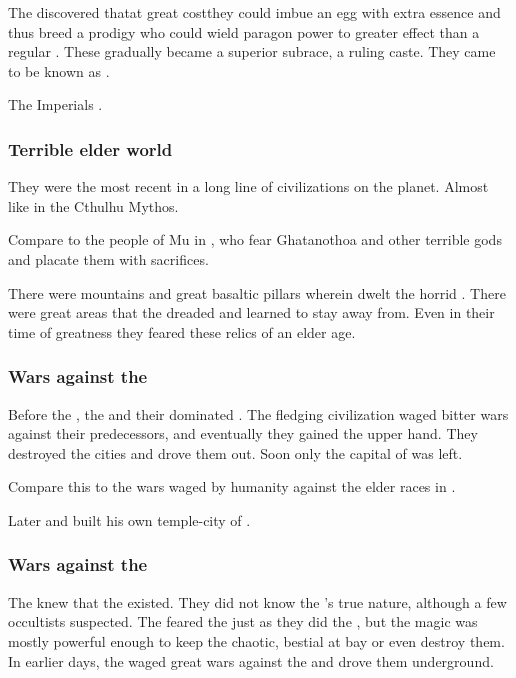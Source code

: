 The \ophidians discovered that\dash at great cost\dash they could imbue an egg with extra essence and thus breed a prodigy who could wield paragon power to greater effect than a regular \ophidian. 
These  gradually became a superior subrace, a ruling caste. 
They came to be known as .

The \ophidian Imperials . 





\subsubsection{Terrible elder world}
They were the most recent in a long line of civilizations on the planet. 
Almost like \humans in the Cthulhu Mythos. 

Compare to the people of Mu in \cite{HPLovecraft:OutoftheAeons}, who fear Ghatanothoa and other terrible gods and placate them with sacrifices. 

There were mountains and great basaltic pillars wherein dwelt the horrid . 
There were great areas that the \ophidians dreaded and learned to stay away from.
Even in their time of greatness they feared these relics of an elder age. 





\subsubsection[Wars against the Shugul]{Wars against the \moonthings}
Before the \ophidians, the \shugul \moonthings and their \moongods dominated \Miith.
The fledging \ophidian civilization waged bitter wars against their predecessors, and eventually they gained the upper hand.
They destroyed the \shugul cities and drove them out.
Soon only the \shugul capital of \Nom was left.

Compare this to the wars waged by humanity against the elder races in \cite{RobertEHoward:TheShadowKingdom}. 

Later  and built his own temple-city of \Baltherium.





\subsubsection{Wars against the \noggyaleth}
The \ophidians knew that the \noggyaleth existed. 
They did not know the \noggyaleth's true nature, although a few occultists suspected.
The \ophidians feared the \noggyaleth just as they did the \xss, but the \ophidian magic was mostly powerful enough to keep the chaotic, bestial \noggyaleth at bay or even destroy them.
In earlier days, the \ophidians waged great wars against the \noggyaleth and drove them underground.






